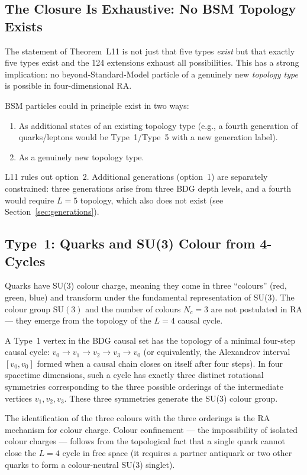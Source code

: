 \documentclass[12pt,a4paper]{article}
\begin{document}
\subsection{The Closure Is Exhaustive: No BSM Topology Exists}

The statement of Theorem~L11 is not just that five types \emph{exist} but that exactly five types exist and the 124 extensions exhaust all possibilities.  This has a strong implication: no beyond-Standard-Model particle of a genuinely new \emph{topology type} is possible in four-dimensional RA.

BSM particles could in principle exist in two ways:
\begin{enumerate}
  \item As additional states of an existing topology type (e.g., a fourth generation of quarks/leptons would be Type~1/Type~5 with a new generation label).
  \item As a genuinely new topology type.
\end{enumerate}
L11 rules out option~2.  Additional generations (option~1) are separately constrained: three generations arise from three BDG depth levels, and a fourth would require $L=5$ topology, which also does not exist (see Section~\ref{sec:generations}).

\subsection{Type~1: Quarks and SU(3) Colour from 4-Cycles}\label{sec:quarks}

Quarks have SU(3) colour charge, meaning they come in three ``colours'' (red, green, blue) and transform under the fundamental representation of SU(3).  The colour group $\mathrm{SU}(3)$ and the number of colours $N_c=3$ are not postulated in RA --- they emerge from the topology of the $L=4$ causal cycle.

A Type~1 vertex in the BDG causal set has the topology of a minimal four-step causal cycle: $v_0\to v_1\to v_2\to v_3\to v_0$ (or equivalently, the Alexandrov interval $[v_0,v_0]$ formed when a causal chain closes on itself after four steps).  In four spacetime dimensions, such a cycle has exactly three distinct rotational symmetries corresponding to the three possible orderings of the intermediate vertices $v_1,v_2,v_3$.  These three symmetries generate the SU(3) colour group.

The identification of the three colours with the three orderings is the RA mechanism for colour charge.  Colour confinement --- the impossibility of isolated colour charges --- follows from the topological fact that a single quark cannot close the $L=4$ cycle in free space (it requires a partner antiquark or two other quarks to form a colour-neutral SU(3) singlet).
\end{document}
